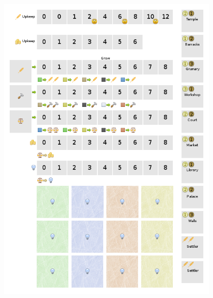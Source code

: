 \documentclass{article}
\begin{document}
\begin{figure}[!htb]
  \includegraphics[scale=1]{../rules/png/doe_player_board.png}
  \caption{}
  \label{fig:game_board}
\end{figure}
\end{document}
